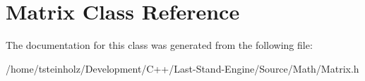 \hypertarget{classMatrix}{}\section{Matrix Class Reference}
\label{classMatrix}


The documentation for this class was generated from the following file\+:\begin{DoxyCompactItemize}
\item 
/home/tsteinholz/\+Development/\+C++/\+Last-\/\+Stand-\/\+Engine/\+Source/\+Math/Matrix.\+h\end{DoxyCompactItemize}
